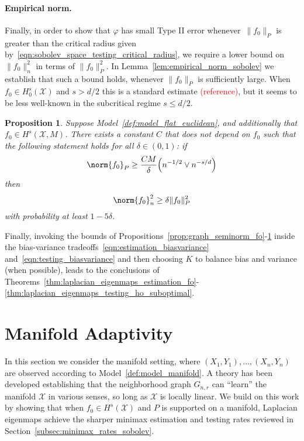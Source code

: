 \documentclass{article}
\newcommand{\1}{\mathbf{1}}
\newcommand{\Xset}{\mathcal{X}}
\newcommand{\mc}[1]{\mathcal{#1}}
\theoremstyle{alden}
\theoremstyle{aldenthm}
\newtheorem{proposition}{Proposition}
\theoremstyle{definition}
\theoremstyle{remark}
\begin{document}
\paragraph{Empirical norm.}
Finally, in order to show that $\varphi$ has small Type II error whenever~$\|f_0\|_P$ is greater than the critical radius given by~\eqref{eqn:sobolev_space_testing_critical_radius}, we require a lower bound on $\|f_0\|_n^2$ in terms of $\|f_0\|_P^2$. In Lemma~\ref{lem:empirical_norm_sobolev} we establish that such a bound holds, whenever $\|f_0\|_P$ is sufficiently large.  When $f_0 \in H_0^s(\mc{X})$ and $s > d/2$ this is a standard estimate \textcolor{red}{(reference)}, but it seems to be less well-known in the subcritical regime $s \leq d/2$.
\begin{proposition}
	\label{prop:empirical_norm_sobolev}
	Suppose Model~\ref{def:model_flat_euclidean}, and additionally that $f_0 \in H^s(\Xset,M)$. There exists a constant $C$ that does not depend on $f_0$ such that the following statement holds for all $\delta \in (0,1)$:  if
	\begin{equation}
	\label{eqn:empirical_norm_sobolev_1}
	\norm{f_0}_{P} \geq \frac{C M}{\delta}\Bigl(n^{-1/2} \vee n^{-s/d}\Bigr)
	\end{equation}
	then
	\begin{equation}
	\label{eqn:empirical_norm_sobolev}
	\norm{f_0}_n^2 \geq \delta \|f_0\|_P^2
	\end{equation}
	with probability at least $1 - 5\delta$.
\end{proposition}

Finally, invoking the bounds of Propositions~\ref{prop:graph_seminorm_fo}-\ref{prop:empirical_norm_sobolev} inside the bias-variance tradeoffs~\eqref{eqn:estimation_biasvariance} and~\eqref{eqn:testing_biasvariance} and then choosing $K$ to balance bias and variance (when possible), leads to the conclusions of Theorems~\ref{thm:laplacian_eigenmaps_estimation_fo}-\ref{thm:laplacian_eigenmaps_testing_ho_suboptimal}.

\section{Manifold Adaptivity}
\label{sec:manifold_adaptivity}

In this section we consider the manifold setting, where $(X_1,Y_1),\ldots,(X_n,Y_n)$ are observed according to Model~\ref{def:model_manifold}. A theory has been developed \citep{niyogi2008finding,belkin03,belkin05,niyogi2013,balakrishnan2012minimax,balakrishnan2013cluster} establishing that the neighborhood graph $G_{n,r}$ can ``learn'' the manifold $\Xset$ in various senses, so long as $\Xset$ is locally linear. We build on this work by showing that when $f_0 \in H^s(\mc{X})$ and $P$ is supported on a manifold, Laplacian eigenmaps achieve the sharper minimax estimation and testing rates reviewed in Section~\ref{subsec:minimax_rates_sobolev}.
\end{document}

